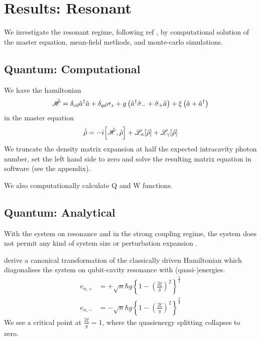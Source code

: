 \section{Results: Resonant}
We investigate the resonant regime, following ref \cite{Carmichael2015}, by computational solution of the master equation, mean-field methods, and monte-carlo simulations.
\subsection{Quantum: Computational}
We have the hamiltonian 
\begin{equation}
  \hat{\mathscr{H}} = \delta_{cd} {\hat{a}^\dagger} \hat{a} + \delta_{qd} \sigma_z + g \left({\hat{a}^\dagger} \hat{\sigma}_- + \hat{\sigma}_+ \hat{a} \right) + \xi \left(\hat{a} + {\hat{a}^\dagger} \right)
\end{equation}
in the master equation
\begin{equation}
  \dot{\dens} = -i \comm{\ham}{\dens} + \lindblad{\kappa}{\dens} + \lindblad{\gamma}{\dens}
\end{equation}
We truncate the density matrix expansion at half the expected intracavity photon number, set the left hand side to zero and solve the resulting matrix equation in software (see the appendix).

We also computationally calculate Q and W functions.
\subsection{Quantum: Analytical}
With the system on resonance and in the strong coupling regime, the system does not permit any kind of system size or perturbation expansion \cite{Carmichael2015}.

\cite{Alsing1992} derive a canonical transformation of the classically driven Hamiltonian which diagonalises the system on qubit-cavity resonance with (quasi-)energies.
\begin{align}
  e_{n, +} &= + \sqrt{n} \hbar g {\left \{1 - {\left ({\frac{2\xi}{g}} \right )}^2 \right \}}^{\frac{3}{4}} \\
  e_{n, -} &= - \sqrt{n} \hbar g {\left \{1 - {\left ({\frac{2\xi}{g}} \right )}^2 \right \}}^{\frac{3}{4}}
\end{align}
We see a critical point at  $\frac{2\xi}{g} = 1$, where the quasienergy splitting collapses to zero.
